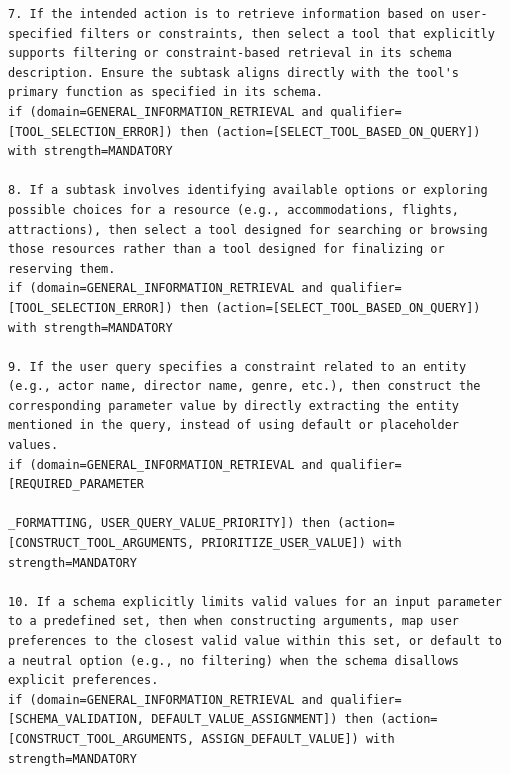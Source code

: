 \begin{lstlisting}[style=rulestyle, caption={Sample rules learned from the BFCL: Live-Multiple dataset}]
7. If the intended action is to retrieve information based on user-specified filters or constraints, then select a tool that explicitly supports filtering or constraint-based retrieval in its schema description. Ensure the subtask aligns directly with the tool's primary function as specified in its schema.
if (domain=GENERAL_INFORMATION_RETRIEVAL and qualifier=[TOOL_SELECTION_ERROR]) then (action=[SELECT_TOOL_BASED_ON_QUERY]) with strength=MANDATORY

8. If a subtask involves identifying available options or exploring possible choices for a resource (e.g., accommodations, flights, attractions), then select a tool designed for searching or browsing those resources rather than a tool designed for finalizing or reserving them.
if (domain=GENERAL_INFORMATION_RETRIEVAL and qualifier=[TOOL_SELECTION_ERROR]) then (action=[SELECT_TOOL_BASED_ON_QUERY]) with strength=MANDATORY

9. If the user query specifies a constraint related to an entity (e.g., actor name, director name, genre, etc.), then construct the corresponding parameter value by directly extracting the entity mentioned in the query, instead of using default or placeholder values.
if (domain=GENERAL_INFORMATION_RETRIEVAL and qualifier=[REQUIRED_PARAMETER

_FORMATTING, USER_QUERY_VALUE_PRIORITY]) then (action=[CONSTRUCT_TOOL_ARGUMENTS, PRIORITIZE_USER_VALUE]) with strength=MANDATORY

10. If a schema explicitly limits valid values for an input parameter to a predefined set, then when constructing arguments, map user preferences to the closest valid value within this set, or default to a neutral option (e.g., no filtering) when the schema disallows explicit preferences.
if (domain=GENERAL_INFORMATION_RETRIEVAL and qualifier=[SCHEMA_VALIDATION, DEFAULT_VALUE_ASSIGNMENT]) then (action=[CONSTRUCT_TOOL_ARGUMENTS, ASSIGN_DEFAULT_VALUE]) with strength=MANDATORY


\end{lstlisting}





